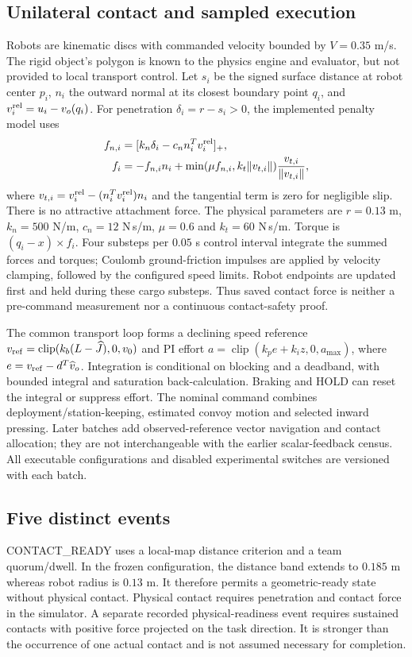 \documentclass[letterpaper,10pt,conference]{ieeeconf}
\begin{document}
\subsection{Unilateral contact and sampled execution}
Robots are kinematic discs with commanded velocity bounded by $V=0.35$ m/s. The rigid object's polygon is known to the physics engine and evaluator, but not provided to local transport control. Let $s_i$ be the signed surface distance at robot center $p_i$, $n_i$ the outward normal at its closest boundary point $q_i$, and $v_i^{\rm rel}=u_i-v_o(q_i)$. For penetration $\delta_i=r-s_i>0$, the implemented penalty model uses
\begin{align}
 f_{n,i}&=[k_n\delta_i-c_n n_i^Tv_i^{\rm rel}]_+,\\
 f_i&=-f_{n,i}n_i+\min(\mu f_{n,i},k_t\|v_{t,i}\|)
                  \frac{v_{t,i}}{\|v_{t,i}\|},
\end{align}
where $v_{t,i}=v_i^{\rm rel}-(n_i^Tv_i^{\rm rel})n_i$ and the tangential term is zero for negligible slip. There is no attractive attachment force. The physical parameters are $r=0.13$ m, $k_n=500$ N/m, $c_n=12$ N\,s/m, $\mu=0.6$ and $k_t=60$ N\,s/m. Torque is $(q_i-x)\mathbin{\times}f_i$. Four substeps per $0.05$ s control interval integrate the summed forces and torques; Coulomb ground-friction impulses are applied by velocity clamping, followed by the configured speed limits. Robot endpoints are updated first and held during these cargo substeps. Thus saved contact force is neither a pre-command measurement nor a continuous contact-safety proof.

The common transport loop forms a declining speed reference $v_{\rm ref}=\operatorname{clip}(k_b(L-\widehat J),0,v_0)$ and PI effort $a=\operatorname{clip}(k_pe+k_i z,0,a_{\max})$, where $e=v_{\rm ref}-d^T\widehat v_o$. Integration is conditional on blocking and a deadband, with bounded integral and saturation back-calculation. Braking and HOLD can reset the integral or suppress effort. The nominal command combines deployment/station-keeping, estimated convoy motion and selected inward pressing. Later batches add observed-reference vector navigation and contact allocation; they are not interchangeable with the earlier scalar-feedback census. All executable configurations and disabled experimental switches are versioned with each batch.

\subsection{Five distinct events}
CONTACT\_READY uses a local-map distance criterion and a team quorum/dwell. In the frozen configuration, the distance band extends to $0.185$ m whereas robot radius is $0.13$ m. It therefore permits a geometric-ready state without physical contact. Physical contact requires penetration and contact force in the simulator. A separate recorded physical-readiness event requires sustained contacts with positive force projected on the task direction. It is stronger than the occurrence of one actual contact and is not assumed necessary for completion.
\end{document}
